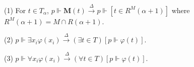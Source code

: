 (1) For $t \in T_{\alpha}$, $p \Vdash \mathbf{M}(t) \overset{\Delta}{\rightarrow} p \Vdash [t \in R^{M}(\alpha + 1)]$ where $R^{M}(\alpha + 1) = M \cap R(\alpha + 1)$.

(2) $p \Vdash \exists x_{i} \varphi(x_{i}) \overset{\Delta}{\rightarrow} (\exists t \in T)[p \Vdash \varphi(t)]$.

(3) $p \Vdash \forall x_{i} \varphi(x_{i}) \overset{\Delta}{\rightarrow} (\forall t \in T)[p \Vdash \varphi(t)]$.
